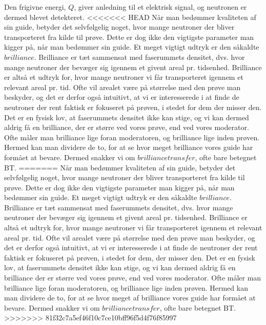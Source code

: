 \documentclass[12pt,oneside,a4paper]{article}
\begin{document}
{{{{{Den frigivne energi, $Q$, giver anledning til et elektrisk signal, og neutronen er dermed blevet detekteret.
<<<<<<< HEAD
Når man bedømmer kvaliteten af sin guide, betyder det selvfølgelig noget, hvor mange neutroner der bliver transporteret fra kilde til prøve. Dette er dog ikke den vigtigste parameter man kigger på, når man bedømmer sin guide. Et meget vigtigt udtryk er den såkaldte $brilliance$. Brilliance er tæt sammensat med faserummets densitet, dvs. hvor mange neutroner der bevæger sig igennem et givent areal pr. tidsenhed. Brilliance er altså et udtryk for, hvor mange neutroner vi får transporteret igennem et relevant areal pr. tid. Ofte vil arealet være på størrelse med den prøve man beskyder, og det er derfor også intuitivt, at vi er interesserede i at finde de neutroner der rent faktisk er fokuseret på prøven, i stedet for dem der misser den. Det er en fysisk lov, at faserummets densitet ikke kan stige, og vi kan dermed aldrig få en brilliance, der er større ved vores prøve, end ved vores moderator. Ofte måler man brilliance lige foran moderatoren, og brilliance lige inden prøven. Hermed kan man dividere de to, for at se hvor meget brilliance vores guide har formået at bevare. Dermed snakker vi om $brilliance transfer$, ofte bare betegnet BT. \cite{lefmann_arleth_kirkensgaard_lebech_thomsen}
=======
Når man bedømmer kvaliteten af sin guide, betyder det selvfølgelig noget, hvor mange neutroner der bliver transporteret fra kilde til prøve. Dette er dog ikke den vigtigste parameter man kigger på, når man bedømmer sin guide. Et meget vigtigt udtryk er den såkaldte $brilliance$. Brilliance er tæt sammensat med faserummets densitet, dvs. hvor mange neutroner der bevæger sig igennem et givent areal pr. tidsenhed. Brilliance er altså et udtryk for, hvor mange neutroner vi får transporteret igennem et relevant areal pr. tid. Ofte vil arealet være på størrelse med den prøve man beskyder, og det er derfor også intuitivt, at vi er interesserede i at finde de neutroner der rent faktisk er fokuseret på prøven, i stedet for dem, der misser den. Det er en fysisk lov, at faserummets densitet ikke kan stige, og vi kan dermed aldrig få en brilliance der er større ved vores prøve, end ved vores moderator. Ofte måler man brilliance lige foran moderatoren, og brilliance lige inden prøven. Hermed kan man dividere de to, for at se hvor meget af brilliance vores guide har formået at bevare. Dermed snakker vi om $brilliance transfer$, ofte bare betegnet BT. \cite{lefmann_arleth_kirkensgaard_lebech_thomsen}
>>>>>>> 81f32c7a5ef46f10c7ce10bff96f5d4f76f85997




}}}}}
\end{document}

